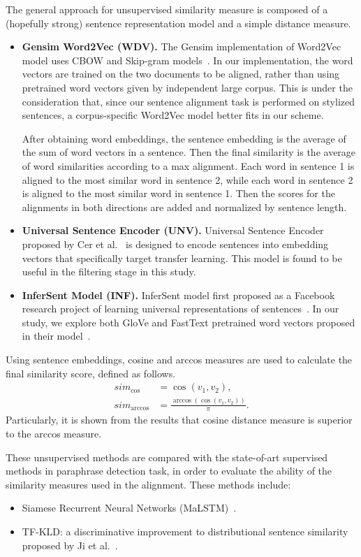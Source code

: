 The general approach for unsupervised similarity measure is composed of a (hopefully strong) sentence representation model and a simple distance measure.
\begin{itemize}
	\item \textbf{Gensim Word2Vec (WDV).} The Gensim implementation of Word2Vec model uses CBOW and Skip-gram models~\cite{mikolov2013distributed}. In our implementation, the word vectors are trained on the two documents to be aligned, rather than using pretrained word vectors given by independent large corpus. This is under the consideration that, since our sentence alignment task is performed on stylized sentences, a corpus-specific Word2Vec model better fits in our scheme. 
	
	After obtaining word embeddings, the sentence embedding is the average of the sum of word vectors in a sentence. Then the final similarity is the average of word similarities according to a max alignment. Each word in sentence 1 is aligned to the most similar word in sentence 2, while each word in sentence 2 is aligned to the most similar word in sentence 1. Then the scores for the alignments in both directions are added and normalized by sentence length.
	\item \textbf{Universal Sentence Encoder (UNV).} Universal Sentence Encoder proposed by Cer et al.~\cite{cer2018universal} is designed to encode sentences into embedding vectors that specifically target transfer learning. This model is found to be useful in the filtering stage in this study.
	\item \textbf{InferSent Model (INF).} InferSent model first proposed as a Facebook research project of learning universal representations of sentences~\cite{conneau2017supervised}. In our study, we explore both GloVe and FastText pretrained word vectors proposed in their model~\cite{pennington2014glove, joulin2017bag}.
\end{itemize}

Using sentence embeddings, cosine and arccos measures are used to calculate the final similarity score, defined as follows.
\begin{align*}
sim_{\cos} & = \cos(v_1, v_2), \\
sim_{\arccos} & = \frac{\arccos(\cos(v_1, v_2))}{\pi}.
\end{align*}
Particularly, it is shown from the results that cosine distance measure is superior to the arccos measure.

These unsupervised methods are compared with the state-of-art supervised methods in paraphrase detection task, in order to evaluate the ability of the similarity measures used in the alignment. These methods include:
\begin{itemize}
	\item Siamese Recurrent Neural Networks (MaLSTM)~\cite{mueller2016siamese}.
	\item TF-KLD: a discriminative improvement to distributional sentence similarity proposed by Ji et al.~\cite{ji2013discriminative}.
\end{itemize}


